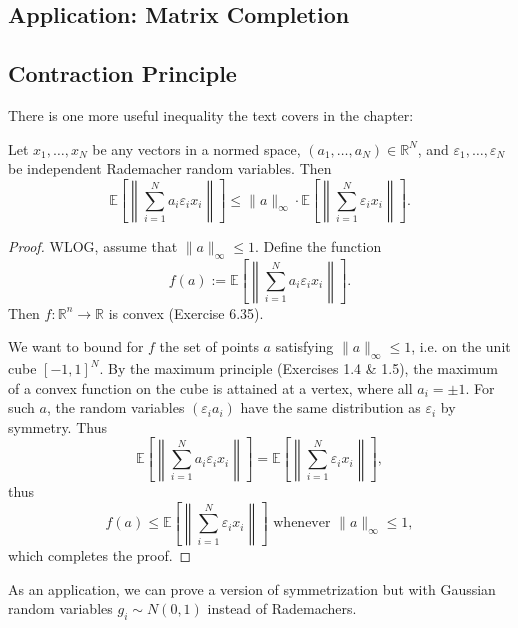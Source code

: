 \subsection{Application: Matrix Completion}




\subsection{Contraction Principle}
There is one more useful inequality the text covers in the chapter:

\begin{theorem}
\label{thm:6.6.1}
Let $x_1, \dots, x_N$ be any vectors in a normed space, $(a_1, \dots, a_N) \in \mathbb{R}^N$, and 
$\varepsilon_1, \dots, \varepsilon_N$ be independent Rademacher random variables. Then 
\[ \mathbb{E}\left[ \left\lVert \sum_{i = 1}^{N} a_i \varepsilon_i x_i \right\rVert \right] 
\leq \lVert a \rVert_{\infty} \cdot \mathbb{E}\left[ \left\lVert 
\sum_{i = 1}^{N} \varepsilon_i x_i \right\rVert \right]. \]
\end{theorem}

\begin{proof}
WLOG, assume that $\lVert a \rVert_{\infty} \leq 1$. Define the function 
\[ f(a) := \mathbb{E}\left[ \left\lVert \sum_{i = 1}^{N} a_i \varepsilon_i x_i \right\rVert \right]. \]
Then $f: \mathbb{R}^n \to \mathbb{R}$ is convex (Exercise 6.35).

We want to bound for $f$ the set of points $a$ satisfying $\lVert a \rVert_{\infty} \leq 1$, i.e. on the unit 
cube $[-1, 1]^N$. By the maximum principle (Exercises 1.4 \& 1.5), the maximum of a convex function on the 
cube is attained at a vertex, where all $a_i = \pm 1$. For such $a$, the random variables $(\varepsilon_i a_i)$ 
have the same distribution as $\varepsilon_i$ by symmetry. Thus 
\[ \mathbb{E}\left[ \left\lVert \sum_{i = 1}^{N} a_i \varepsilon_i x_i \right\rVert \right] 
= \mathbb{E}\left[ \left\lVert \sum_{i = 1}^{N} \varepsilon_i x_i \right\rVert \right], \]
thus 
\[ f(a) \leq \mathbb{E}\left[ \left\lVert \sum_{i = 1}^{N} \varepsilon_i x_i \right\rVert \right] 
\text{ whenever } \lVert a \rVert_{\infty} \leq 1, \]
which completes the proof.
\end{proof}

As an application, we can prove a version of symmetrization but with Gaussian random variables 
$g_i \sim N(0, 1)$ instead of Rademachers.

